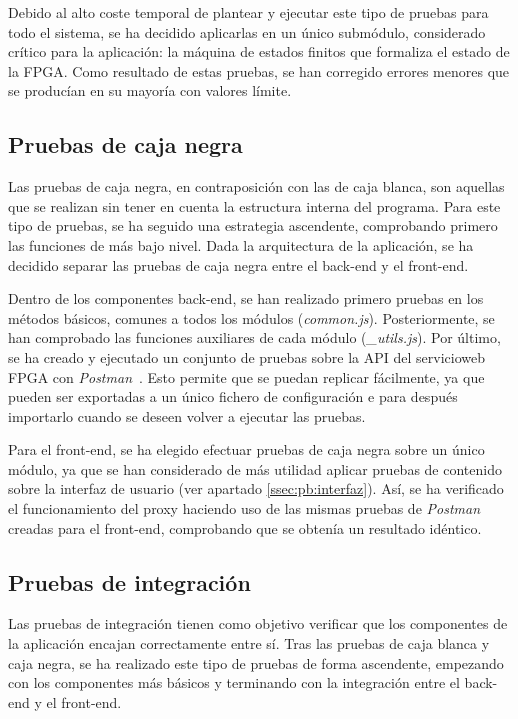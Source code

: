Debido al alto coste temporal de plantear y ejecutar este tipo de pruebas para todo el sistema, se ha decidido aplicarlas en un único submódulo, considerado crítico para la aplicación: la máquina de estados finitos que formaliza el estado de la \gls{FPGA}.
Como resultado de estas pruebas, se han corregido errores menores que se producían en su mayoría con valores límite.

\subsection*{Pruebas de caja negra\label{ssec:pb:caja_negra}}

Las pruebas de caja negra, en contraposición con las de caja blanca, son aquellas que se realizan sin tener en cuenta la estructura interna del programa.
Para este tipo de pruebas, se ha seguido una estrategia ascendente, comprobando primero las funciones de más bajo nivel.
Dada la arquitectura de la aplicación, se ha decidido separar las pruebas de caja negra entre el \gls{back-end} y el \gls{front-end}.

Dentro de los componentes \gls{back-end}, se han realizado primero pruebas en los métodos básicos, comunes a todos los módulos (\textit{common.js}).
Posteriormente, se han comprobado las funciones auxiliares de cada módulo (\textit{\_utils.js}).
Por último, se ha creado y ejecutado un conjunto de pruebas sobre la \gls{API} del \gls{servicioweb} \gls{FPGA} con \textit{Postman}~\cite{postman}.
Esto permite que se puedan replicar fácilmente, ya que pueden ser exportadas a un único fichero de configuración e para después importarlo cuando se deseen volver a ejecutar las pruebas.

Para el \gls{front-end}, se ha elegido efectuar pruebas de caja negra sobre un único módulo, ya que se han considerado de más utilidad aplicar pruebas de contenido sobre la interfaz de usuario (ver apartado \ref{ssec:pb:interfaz}).
Así, se ha verificado el funcionamiento del \gls{proxy} haciendo uso de las mismas pruebas de \textit{Postman} creadas para el \gls{front-end}, comprobando que se obtenía un resultado idéntico.

\subsection*{Pruebas de integración\label{ssec:pb:integracion}}

Las pruebas de integración tienen como objetivo verificar que los componentes de la aplicación encajan correctamente entre sí.
Tras las pruebas de caja blanca y caja negra, se ha realizado este tipo de pruebas de forma ascendente, empezando con los componentes más básicos y terminando con la integración entre el \gls{back-end} y el \gls{front-end}.

